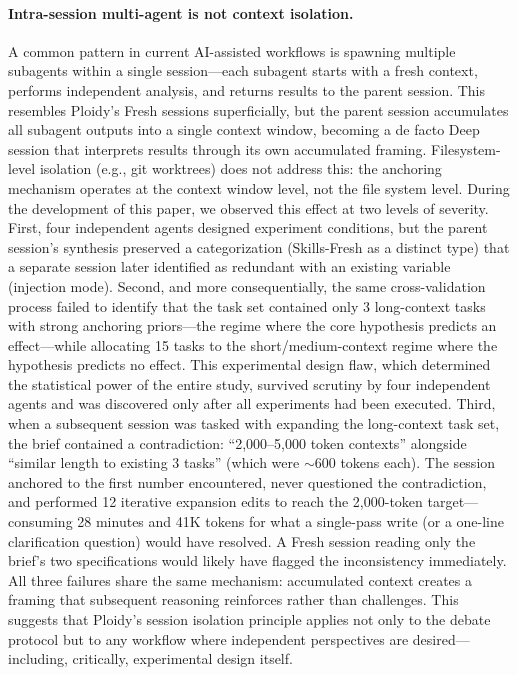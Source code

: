 \documentclass[11pt]{article}
\begin{document}
\paragraph{Intra-session multi-agent is not context isolation.}
A common pattern in current AI-assisted workflows is spawning multiple subagents within a single session---each subagent starts with a fresh context, performs independent analysis, and returns results to the parent session. This resembles Ploidy's Fresh sessions superficially, but the parent session accumulates all subagent outputs into a single context window, becoming a de facto Deep session that interprets results through its own accumulated framing. Filesystem-level isolation (e.g., git worktrees) does not address this: the anchoring mechanism operates at the context window level, not the file system level. During the development of this paper, we observed this effect at two levels of severity. First, four independent agents designed experiment conditions, but the parent session's synthesis preserved a categorization (Skills-Fresh as a distinct type) that a separate session later identified as redundant with an existing variable (injection mode). Second, and more consequentially, the same cross-validation process failed to identify that the task set contained only 3 long-context tasks with strong anchoring priors---the regime where the core hypothesis predicts an effect---while allocating 15 tasks to the short/medium-context regime where the hypothesis predicts no effect. This experimental design flaw, which determined the statistical power of the entire study, survived scrutiny by four independent agents and was discovered only after all experiments had been executed. Third, when a subsequent session was tasked with expanding the long-context task set, the brief contained a contradiction: ``2,000--5,000 token contexts'' alongside ``similar length to existing 3 tasks'' (which were $\sim$600 tokens each). The session anchored to the first number encountered, never questioned the contradiction, and performed 12 iterative expansion edits to reach the 2,000-token target---consuming 28 minutes and 41K tokens for what a single-pass write (or a one-line clarification question) would have resolved. A Fresh session reading only the brief's two specifications would likely have flagged the inconsistency immediately. All three failures share the same mechanism: accumulated context creates a framing that subsequent reasoning reinforces rather than challenges. This suggests that Ploidy's session isolation principle applies not only to the debate protocol but to any workflow where independent perspectives are desired---including, critically, experimental design itself.
\end{document}
